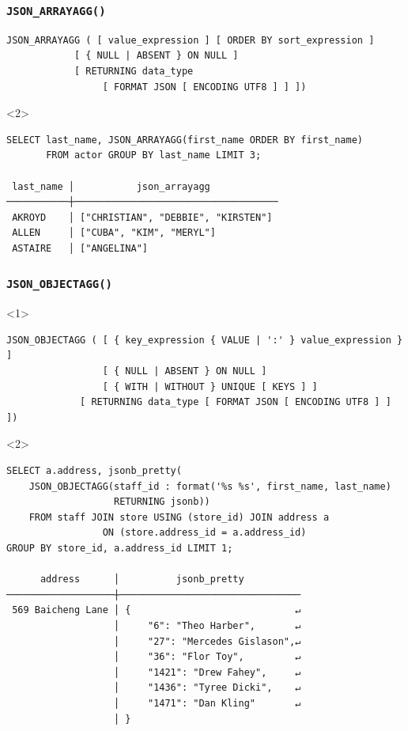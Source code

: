 \begin{frame}[fragile]
  \frametitle{\texttt{JSON\_ARRAYAGG()}}
    \begin{lstlisting}
JSON_ARRAYAGG ( [ value_expression ] [ ORDER BY sort_expression ]
	        [ { NULL | ABSENT } ON NULL ]
	        [ RETURNING data_type
		         [ FORMAT JSON [ ENCODING UTF8 ] ] ])
    \end{lstlisting}

  \begin{onlyenv}<2>
    \begin{lstlisting}
SELECT last_name, JSON_ARRAYAGG(first_name ORDER BY first_name)
       FROM actor GROUP BY last_name LIMIT 3;

 last_name │           json_arrayagg            
───────────┼────────────────────────────────────
 AKROYD    │ ["CHRISTIAN", "DEBBIE", "KIRSTEN"]
 ALLEN     │ ["CUBA", "KIM", "MERYL"]
 ASTAIRE   │ ["ANGELINA"]
    \end{lstlisting}
  \end{onlyenv}
\end{frame}

\begin{frame}[fragile]
  \frametitle{\texttt{JSON\_OBJECTAGG()}}

  \begin{onlyenv}<1>
\begin{lstlisting}
JSON_OBJECTAGG ( [ { key_expression { VALUE | ':' } value_expression } ]
                 [ { NULL | ABSENT } ON NULL ]
                 [ { WITH | WITHOUT } UNIQUE [ KEYS ] ]
             [ RETURNING data_type [ FORMAT JSON [ ENCODING UTF8 ] ] ])
\end{lstlisting}
  \end{onlyenv}

  \begin{onlyenv}<2>
    \begin{lstlisting}
SELECT a.address, jsonb_pretty(
    JSON_OBJECTAGG(staff_id : format('%s %s', first_name, last_name)
                   RETURNING jsonb))
    FROM staff JOIN store USING (store_id) JOIN address a
                 ON (store.address_id = a.address_id)
GROUP BY store_id, a.address_id LIMIT 1;

      address      │          jsonb_pretty          
───────────────────┼────────────────────────────────
 569 Baicheng Lane │ {                             ↵
                   │     "6": "Theo Harber",       ↵
                   │     "27": "Mercedes Gislason",↵
                   │     "36": "Flor Toy",         ↵
                   │     "1421": "Drew Fahey",     ↵
                   │     "1436": "Tyree Dicki",    ↵
                   │     "1471": "Dan Kling"       ↵
                   │ }
    \end{lstlisting}
  \end{onlyenv}
\end{frame}

